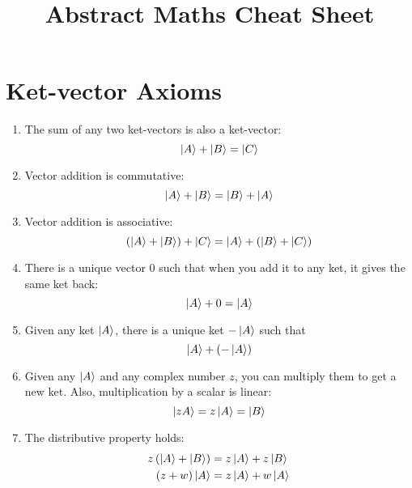 \documentclass[12pt,a4paper,twocolumn]{article}
\title{Abstract Maths Cheat Sheet}
\date{}
\author{}
\numberwithin{equation}{section}
\begin{document}
\maketitle

\section{Ket-vector Axioms}
\begin{enumerate}
    \item The sum of any two ket-vectors is also a ket-vector:
    \begin{equation}
        \ket{A}  + \ket{B} = \ket{C}
    \end{equation}
    \item Vector addition is commutative:
    \begin{equation}
        \ket{ A } +\ket{ B } =\ket{B} +\ket{A}
    \end{equation}
    \item Vector addition is associative:
    \begin{equation}
        \left(\ket{ A } +\ket{ B }\right)+\ket{ C } =\ket{ A } +  \left(\ket{B }+\ket{ C }\right)
    \end{equation}
    \item There is a unique vector $0$ such that when you add it to any ket, it gives the same ket back:
    \begin{equation}
       \ket{ A } + 0 =\ket{ A }
    \end{equation}
    \item Given any ket $\ket{A}$, there is a unique ket $-\ket{A}$ such that
    \begin{equation}
       \ket{A} + \left( -\ket{A} \right)
    \end{equation}
    \item Given any $\ket{A}$ and any complex number $z$, you can multiply them to get a new ket. Also, multiplication by a scalar is linear:
    \begin{equation}
       \ket{zA} = z\ket{ A } =\ket{B}
    \end{equation}
    \item The distributive property holds:
    \begin{align}
        z\left(\ket{A} +\ket{B}\right) &=  z\ket{A} + z\ket{B}\\
        \left( z+w\right)\ket{A} &= z\ket{A} + w\ket{A}
    \end{align}
\end{enumerate}
\end{document}
